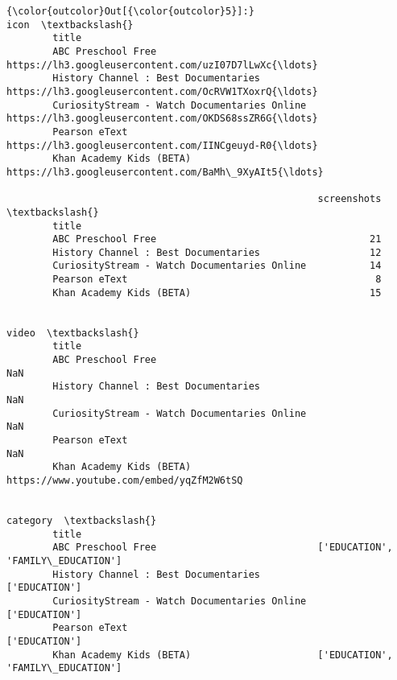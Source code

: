 \documentclass[11pt]{article}
\begin{document}
\begin{Verbatim}[commandchars=\\\{\}]
{\color{outcolor}Out[{\color{outcolor}5}]:}                                                                                            icon  \textbackslash{}
        title                                                                                             
        ABC Preschool Free                            https://lh3.googleusercontent.com/uzI07D7lLwXc{\ldots}   
        History Channel : Best Documentaries          https://lh3.googleusercontent.com/OcRVW1TXoxrQ{\ldots}   
        CuriosityStream - Watch Documentaries Online  https://lh3.googleusercontent.com/OKDS68ssZR6G{\ldots}   
        Pearson eText                                 https://lh3.googleusercontent.com/IINCgeuyd-R0{\ldots}   
        Khan Academy Kids (BETA)                      https://lh3.googleusercontent.com/BaMh\_9XyAIt5{\ldots}   
        
                                                      screenshots  \textbackslash{}
        title                                                       
        ABC Preschool Free                                     21   
        History Channel : Best Documentaries                   12   
        CuriosityStream - Watch Documentaries Online           14   
        Pearson eText                                           8   
        Khan Academy Kids (BETA)                               15   
        
                                                                                          video  \textbackslash{}
        title                                                                                     
        ABC Preschool Free                                                                  NaN   
        History Channel : Best Documentaries                                                NaN   
        CuriosityStream - Watch Documentaries Online                                        NaN   
        Pearson eText                                                                       NaN   
        Khan Academy Kids (BETA)                      https://www.youtube.com/embed/yqZfM2W6tSQ   
        
                                                                               category  \textbackslash{}
        title                                                                             
        ABC Preschool Free                            ['EDUCATION', 'FAMILY\_EDUCATION']   
        History Channel : Best Documentaries                              ['EDUCATION']   
        CuriosityStream - Watch Documentaries Online                      ['EDUCATION']   
        Pearson eText                                                     ['EDUCATION']   
        Khan Academy Kids (BETA)                      ['EDUCATION', 'FAMILY\_EDUCATION']   
        

\end{Verbatim}
\end{document}

